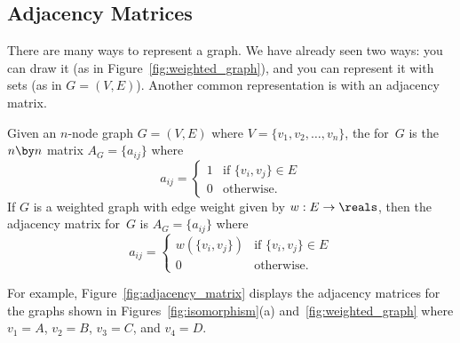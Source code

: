 \subsection{Adjacency Matrices}

There are many ways to represent a graph.  We have already seen two
ways: you can draw it (\eg as in Figure~\ref{fig:weighted_graph}), and
you can represent it with sets (as in $G = (V, E)$).  Another common
representation is with an adjacency matrix.

\begin{definition}\label{def:adjacency_matrix}

Given an $n$-node graph $G = (V, E)$ where $V = \{ v_1, v_2, \dots,
v_n \}$, the  for~$G$ is the $n \by n$ matrix
$A_G = \{ a_{ij} \}$ where
\begin{equation*}
    a_{ij} = \begin{cases}
                1 & \text{if $\{ v_i, v_j \} \in E$} \\
                0 & \text{otherwise.}
              \end{cases}
\end{equation*}
If $G$ is a weighted graph with edge weight given by $w: E \to
\reals$, then the adjacency matrix for~$G$ is $A_G = \{ a_{ij} \}$
where
\begin{equation*}
    a_{ij} = \begin{cases}
                w(\{ v_i, v_j \}) & \text{if $\{ v_i, v_j \} \in E$} \\
                0                 & \text{otherwise.}
              \end{cases}
\end{equation*}
\end{definition}

For example, Figure~\ref{fig:adjacency_matrix} displays the adjacency
matrices for the graphs shown in Figures~\ref{fig:isomorphism}(a)
and~\ref{fig:weighted_graph} where $v_1 = A$, $v_2 = B$, $v_3 = C$,
and $v_4 = D$.

